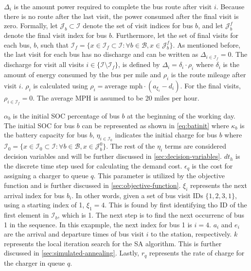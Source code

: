 \documentclass[11pt,a4paper,final]{article}
\newcommand{\Iset}{\mathcal{I}}             %
\newcommand{\Isetinit}{\mathcal{I}_0}       %
\newcommand{\Isetfinal}{\mathcal{I}_f}      %
\newcommand{\Bset}{\mathcal{B}}             %
\newcommand{\Jset}{\mathcal{J}}             %
\begin{document}
\(\Delta_i\) is the amount power required to complete the bus route after visit \(i\). Because there is no route after the
last visit, the power consumed after the final visit is zero. Formally, let \(\Jset_b \subset \Iset\) denote the set of
visit indices for bus \(b\), and let \(\Jset_b^f\) denote the final visit index for bus \(b\). Furthermore, let the set of
final visits for each bus, \(b\), such that \(\Isetfinal = \{ x \in \Isetfinal \subset \Iset : \forall b \in \Bset, x \in
\Jset_b^f \}\). As mentioned before, the last visit for each bus has no discharge and can be written as \(\Delta_{i \in
\Isetfinal} = 0\). The discharge for visit all visits \(i \in \{\Iset \setminus \Isetfinal\}\), is defined by \(\Delta_i =
\delta_i \cdot \rho_i\) where \(\delta_i\) is the amount of energy consumed by the bus per mile and \(\rho_i\) is the route
mileage after visit \(i\). \(\rho_i\) is calculated using \(\rho_i = \text{average mph} \cdot (a_{\xi_i} - d_i)\). For the
final visits, \(\rho_{i \in \Isetfinal} = 0\). The average MPH is assumed to be 20 miles per hour.

\(\alpha_b\) is the initial SOC percentage of bus \(b\) at the beginning of the working day. The initial SOC for bus \(b\) can
be represented as shown in \ref{eq:batinit} where \(\kappa_b\) is the battery capacity for bus \(b\), \(\eta_{i \in \Isetinit}\)
indicates the initial charge for bus \(b\) where \(\Isetinit = \{ x \in \Isetinit \subset \Iset : \forall b \in \Bset, x
\in \Jset_b^0 \}\). The rest of the \(\eta_i\) terms are considered decision variables and will be further discussed in
\ref{sec:decision-variables}. \(dt_h\) is the discrete time step used for calculating the demand cost. \(\epsilon_q\) is the cost
for assigning a charger to queue \(q\). This parameter is utilized by the objective function and is further discussed in
\ref{sec:objective-function}. \(\xi_i\) represents the next arrival index for bus \(b_i\). In other words, given a set of bus
visit IDs \(\{ 1,2,3,1\}\), using a starting index of 1, \(\xi_1 = 4\). This is found by first identifying tho ID of the
first element in \(\Iset_b\), which is 1. The next step is to find the next occurrenc of bus 1 in the sequence. In this
exapmple, the next index for bus 1 is \(i= 4\). \(a_i\) and \(e_i\) are the arrival and departure times of bus visit \(i\) to
the station, respectively. \(k\) represents the local iteration search for the SA algorithm. This is further discussed in
\ref{sec:simulated-annealing}. Lastly, \(r_q\) represents the rate of charge for the charger in queue \(q\).
\end{document}
